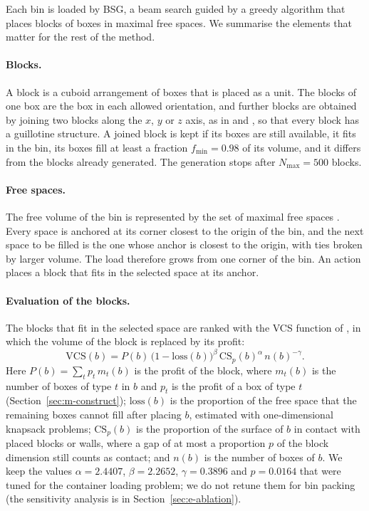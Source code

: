 Each bin is loaded by BSG, a beam search guided by a greedy algorithm \citep{Araya2014,Araya2017}
that places blocks of boxes in maximal free spaces. We summarise the elements that matter for
the rest of the method.

\paragraph{Blocks.}
A block is a cuboid arrangement of boxes that is placed as a unit. The blocks of one box are the
box in each allowed orientation, and further blocks are obtained by joining two blocks along the
$x$, $y$ or $z$ axis, as in \citet{Fanslau2010} and \citet{Araya2014}, so that every block has a
guillotine structure.
A joined block is kept if its boxes are still available, it fits in the bin, its boxes fill at
least a fraction $f_{\min}=0.98$ of its volume, and it differs from the blocks already generated.
The generation stops after $N_{\max}=500$ blocks.

\paragraph{Free spaces.}
The free volume of the bin is represented by the set of maximal free spaces \citep{Parreno2008}.
Every space is anchored at its corner closest to the origin of the bin, and the next space to be
filled is the one whose anchor is closest to the origin, with ties broken by larger volume. The
load therefore grows from one corner of the bin. An action places a block that fits in the
selected space at its anchor.

\paragraph{Evaluation of the blocks.}
The blocks that fit in the selected space are ranked with the VCS function of \citet{Araya2017},
in which the volume of the block is replaced by its profit:
\begin{equation}
\label{eq:vcs}
\mathrm{VCS}(b) = P(b)\,\bigl(1-\mathrm{loss}(b)\bigr)^{\beta}\,\mathrm{CS}_p(b)^{\alpha}\,n(b)^{-\gamma}.
\end{equation}
Here $P(b)=\sum_t p_t\,m_t(b)$ is the profit of the block, where $m_t(b)$ is the number of boxes
of type $t$ in $b$ and $p_t$ is the profit of a box of type $t$ (Section~\ref{sec:m-construct});
$\mathrm{loss}(b)$ is the proportion of the free space that the remaining boxes cannot fill
after placing $b$, estimated with one-dimensional knapsack problems; $\mathrm{CS}_p(b)$ is the
proportion of the surface of $b$ in contact with placed blocks or walls, where a gap of at most
a proportion $p$ of the block dimension still counts as contact; and $n(b)$ is the number of boxes
of $b$. We keep the values $\alpha=2.4407$, $\beta=2.2652$, $\gamma=0.3896$ and $p=0.0164$ that
were tuned for the container loading problem; we do not retune them for bin packing
(the sensitivity analysis is in Section~\ref{sec:e-ablation}).

